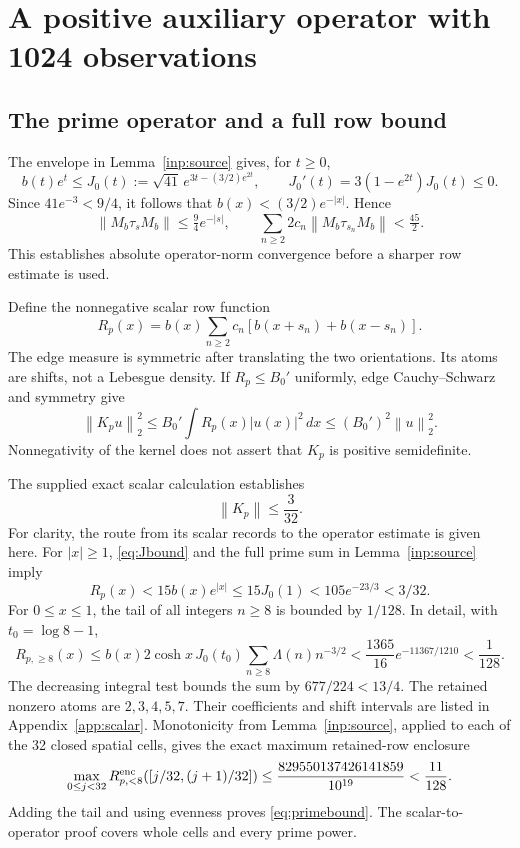 \documentclass[11pt,a4paper]{article}
\numberwithin{equation}{section}
\theoremstyle{definition}\newtheorem{definition}[theorem]{Definition}
\theoremstyle{remark}\newtheorem{remark}[theorem]{Remark}
\newcommand{\norm}[1]{\left\|#1\right\|}
\begin{document}
\section{A positive auxiliary operator with 1024 observations}\label{sec:coercivity}
\subsection{The prime operator and a full row bound}
The envelope in Lemma~\ref{inp:source} gives, for $t\ge0$,
\begin{equation}\label{eq:Jbound}
 b(t)e^t\le J_0(t):=\sqrt{41}\,e^{3t-(3/2)e^{2t}},
 \qquad J_0'(t)=3(1-e^{2t})J_0(t)\le0.
\end{equation}
Since $41e^{-3}<9/4$, it follows that $b(x)<(3/2)e^{-|x|}$. Hence
\[
 \norm{M_b\tau_sM_b}\le\tfrac94e^{-|s|},\qquad
 \sum_{n\ge2}2c_n\norm{M_b\tau_{s_n}M_b}<\tfrac{45}{2}.
\]
This establishes absolute operator-norm convergence before a sharper row estimate is used.

Define the nonnegative scalar row function
\begin{equation}\label{eq:row}
 R_p(x)=b(x)\sum_{n\ge2}c_n[b(x+s_n)+b(x-s_n)].
\end{equation}
The edge measure is symmetric after translating the two orientations. Its atoms are shifts, not a Lebesgue density. If $R_p\le B_0'$ uniformly, edge Cauchy--Schwarz and symmetry give
\begin{equation}\label{eq:schur}
 \norm{K_pu}_2^2\le B_0'\int R_p(x)|u(x)|^2\,dx
 \le(B_0')^2\norm u_2^2.
\end{equation}
Nonnegativity of the kernel does not assert that $K_p$ is positive semidefinite.

The supplied exact scalar calculation establishes
\begin{equation}\label{eq:primebound}
 \norm{K_p}\le\frac3{32}.
\end{equation}
For clarity, the route from its scalar records to the operator estimate is given here. For $|x|\ge1$, \eqref{eq:Jbound} and the full prime sum in Lemma~\ref{inp:source} imply
\[
 R_p(x)<15b(x)e^{|x|}\le15J_0(1)<105e^{-23/3}<3/32.
\]
For $0\le x\le1$, the tail of all integers $n\ge8$ is bounded by $1/128$. In detail, with $t_0=\log8-1$,
\[
 R_{p,\ge8}(x)\le b(x)2\cosh x\,J_0(t_0)
   \sum_{n\ge8}\Lambda(n)n^{-3/2}
 <\frac{1365}{16}e^{-11367/1210}<\frac1{128}.
\]
The decreasing integral test bounds the sum by $677/224<13/4$. The retained nonzero atoms are $2,3,4,5,7$. Their coefficients and shift intervals are listed in Appendix~\ref{app:scalar}. Monotonicity from Lemma~\ref{inp:source}, applied to each of the 32 closed spatial cells, gives the exact maximum retained-row enclosure
\begin{equation}\label{eq:rowmax}
 \max_{0\le j<32}R_{p,<8}^{\rm enc}([j/32,(j+1)/32])
 \le\frac{829550137426141859}{10^{19}}<\frac{11}{128}.
\end{equation}
Adding the tail and using evenness proves \eqref{eq:primebound}. The scalar-to-operator proof covers whole cells and every prime power.
\end{document}
